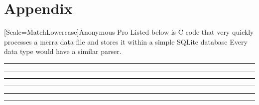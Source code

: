 \section{Appendix}
\newfontfamily{\anonymous}[Scale=MatchLowercase]{Anonymous Pro}
\lstset{ %
    language=C,                             %
    basicstyle=\anonymous,
    tabsize=2,
    breaklines=true,
    breakatwhitespace=false,
    showstringspaces=false,
    showtabs=false
}
Listed below is C code that very quickly processes a \gls{merra} data file and stores it within a simple SQLite database \cite{keller} Every data type would have a similar parser.

\hrule

\hrule

\hrule

\hrule

\hrule

\hrule

